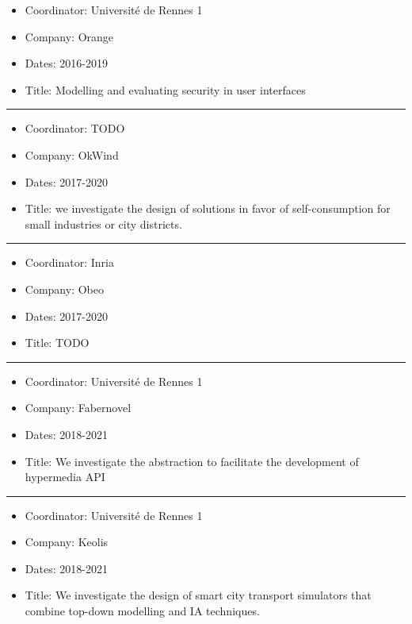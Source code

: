 \documentclass{ra2018}
\begin{document}
\begin{itemize}
	\item Coordinator: Universit\'e de Rennes 1
	\item Company: Orange
	\item Dates: 2016-2019
	\item Title: Modelling and evaluating security in user interfaces
\end{itemize}
\rule{\linewidth}{.2pt}

\begin{itemize}
	\item Coordinator: TODO
	\item Company: OkWind
	\item Dates: 2017-2020
	\item Title: we investigate the design of solutions in favor of self-consumption for small industries or city districts.
\end{itemize}
\rule{\linewidth}{.2pt}

\begin{itemize}
	\item Coordinator: Inria
	\item Company: Obeo
	\item Dates: 2017-2020
	\item Title: TODO
\end{itemize}
\rule{\linewidth}{.2pt}

\begin{itemize}
	\item Coordinator: Universit\'e de Rennes 1
	\item Company: Fabernovel
	\item Dates: 2018-2021
	\item Title: We investigate the abstraction to facilitate the development of hypermedia API
\end{itemize}
\rule{\linewidth}{.2pt}

\begin{itemize}
	\item Coordinator: Universit\'e de Rennes 1
	\item Company: Keolis
	\item Dates: 2018-2021
	\item Title:  We investigate the design of smart city transport simulators that combine top-down modelling and IA techniques.
\end{itemize}


\end{document}
